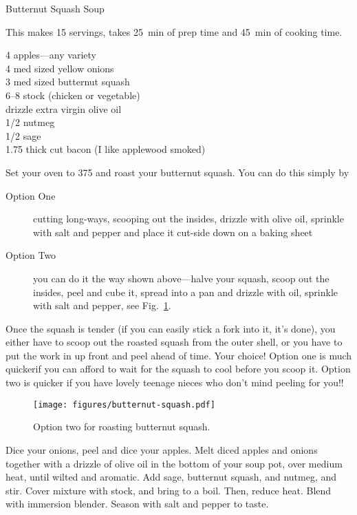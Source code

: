 \begin{entry}{Butternut Squash Soup}
\begin{open}
  This makes 15 servings, takes \SI{25}{\minute} of prep time and
  \SI{45}{\minute} of cooking time.
\end{open}
\begin{ingredients}
    4  apples---any variety\\
    4  med sized yellow onions\\
    3  med sized butternut squash\\
    \SIrange{6}{8}{\cup} stock (chicken or vegetable)\\
    drizzle  extra virgin olive oil\\
    \SI{1/2}{\teaspoon}  nutmeg\\
    \SI{1/2}{\teaspoon}  sage\\
    \SI{1.75}{\pound} thick cut bacon (I like applewood smoked)
\end{ingredients}
Set your oven to \SI{375}{\degreeF} and roast your butternut squash. You can
do this simply by
\begin{description}
    \item[Option One] cutting long-ways, scooping out the insides, drizzle with
    olive oil, sprinkle with salt and pepper and place it cut-side down on a
    baking sheet
    \item[Option Two] you can do it the way shown above---halve
    your squash, scoop out the insides, peel and cube it, spread into a pan and
    drizzle with oil, sprinkle with salt and pepper, see Fig.~\ref{fig:butternut-squash-two}.
\end{description}
Once the squash is tender (if you can easily stick a fork into it, it's done),
you either have to scoop out the roasted squash from the outer shell, or you
have to put the work in up front and peel ahead of time. Your choice! Option
one is much quicker\textellipsis if you can afford to wait for the squash to
cool before you scoop it. Option two is quicker if you have lovely teenage
nieces who don't mind peeling for you!!
\begin{figure}
    \centering
    \texttt{[image: figures/butternut-squash.pdf]}
    \caption{Option two for roasting butternut squash.}
    \label{fig:butternut-squash-two}
\end{figure}

Dice your onions, peel and dice your apples. Melt diced apples and onions
together with a drizzle of olive oil in the bottom of your soup pot, over
medium heat, until wilted and aromatic. Add sage, butternut squash, and
nutmeg, and stir. Cover mixture with stock, and bring to a boil. Then, reduce
heat. Blend with immersion blender. Season with salt and pepper to taste.


\end{entry}
